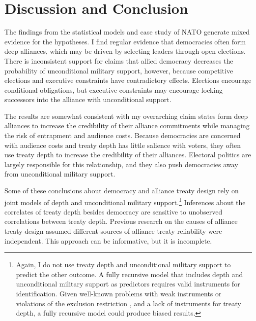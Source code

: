 \documentclass[12pt]{article}
\begin{document}
\section{Discussion and Conclusion}


The findings from the statistical models and case study of NATO generate mixed evidence for the hypotheses. 
I find regular evidence that democracies often form deep alliances, which may be driven by selecting leaders through open elections.  
There is inconsistent support for claims that allied democracy decreases the probability of unconditional military support, however, because competitive elections and executive constraints have contradictory effects. 
Elections encourage conditional obligations, but executive constraints may encourage locking successors into the alliance with unconditional support. 


The results are somewhat consistent with my overarching claim states form deep alliances to increase the credibility of their alliance commitments while managing the risk of entrapment and audience costs. 
Because democracies are concerned with audience costs and treaty depth has little salience with voters, they often use treaty depth to increase the credibility of their alliances.
Electoral politics are largely responsible for this relationship, and they also push democracies away from unconditional military support. 


Some of these conclusions about democracy and alliance treaty design rely on joint models of depth and unconditional military support.\footnote{Again, I do not use treaty depth and unconditional military support to predict the other outcome. 
A fully recursive model that includes depth and unconditional military support as predictors requires valid instruments for identification.
Given well-known problems with weak instruments \citep{Kraay2012} or violations of the exclusion restriction \citep{Bartels1991}, and a lack of instruments for treaty depth, a fully recursive model could produce biased results.}  
Inferences about the correlates of treaty depth besides democracy are sensitive to unobserved correlations between treaty depth.  
Previous research on the causes of alliance treaty design \citep{Benson2012, Mattes2012, Chibaetal2015} assumed different sources of alliance treaty reliability were independent. 
This approach can be informative, but it is incomplete.
\end{document}
